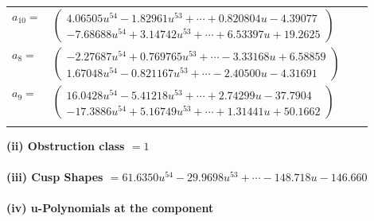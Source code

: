 \documentclass[1p]{elsarticle_modified}
\theoremstyle{definition}
\begin{document}
\begin{tabular}{m{7pt} m{180pt} m{7pt} m{180pt} }
\flushright $a_{10}=$&$\begin{pmatrix}4.06505 u^{54}-1.82961 u^{53}+\cdots+0.820804 u-4.39077\\-7.68688 u^{54}+3.14742 u^{53}+\cdots+6.53397 u+19.2625\end{pmatrix}$ \\
\flushright $a_{8}=$&$\begin{pmatrix}-2.27687 u^{54}+0.769765 u^{53}+\cdots-3.33168 u+6.58859\\1.67048 u^{54}-0.821167 u^{53}+\cdots-2.40500 u-4.31691\end{pmatrix}$ \\
\flushright $a_{9}=$&$\begin{pmatrix}16.0428 u^{54}-5.41218 u^{53}+\cdots+2.74299 u-37.7904\\-17.3886 u^{54}+5.16749 u^{53}+\cdots+1.31441 u+50.1662\end{pmatrix}$\\&\end{tabular}
\flushleft \textbf{(ii) Obstruction class $= 1$}\\~\\
\flushleft \textbf{(iii) Cusp Shapes $= 61.6350 u^{54}-29.9698 u^{53}+\cdots-148.718 u-146.660$}\\~\\
\newpage\renewcommand{\arraystretch}{1}
\flushleft \textbf{(iv) u-Polynomials at the component}\newline \\
\end{document}
